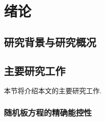 \chapter{绪论}

\section{研究背景与研究概况}


\section{主要研究工作}

本节将介绍本文的主要研究工作.

\subsection{随机板方程的精确能控性}

\cite{Barbu2003}
